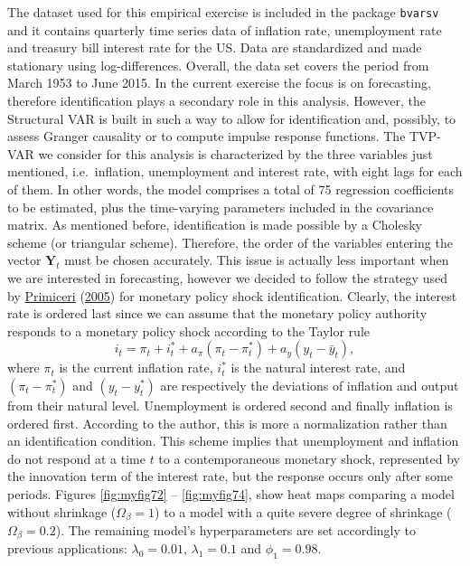 \documentclass[
  12pt,
]{book}
\theoremstyle{break}
\theoremstyle{nonumberplain}
\begin{document}
The dataset used for this empirical exercise is included in the package
\texttt{bvarsv} and it contains quarterly time series data of inflation
rate, unemployment rate and treasury bill interest rate for the US. Data
are standardized and made stationary using log-differences. Overall, the
data set covers the period from March 1953 to June 2015. In the current
exercise the focus is on forecasting, therefore identification plays a
secondary role in this analysis. However, the Structural VAR is built in
such a way to allow for identification and, possibly, to assess Granger
causality or to compute impulse response functions. The TVP-VAR we
consider for this analysis is characterized by the three variables just
mentioned, i.e.~inflation, unemployment and interest rate, with eight
lags for each of them. In other words, the model comprises a total of 75
regression coefficients to be estimated, plus the time-varying
parameters included in the covariance matrix. As mentioned before,
identification is made possible by a Cholesky scheme (or triangular
scheme). Therefore, the order of the variables entering the vector
\(\boldsymbol{Y}_{t}\) must be chosen accurately. This issue is actually
less important when we are interested in forecasting, however we decided
to follow the strategy used by
\protect\hyperlink{ref-Primicieri_2005}{Primiceri}
(\protect\hyperlink{ref-Primicieri_2005}{2005}) for monetary policy
shock identification. Clearly, the interest rate is ordered last since
we can assume that the monetary policy authority responds to a monetary
policy shock according to the Taylor rule
\[i_{t}=\pi _{t}+i_{t}^{*}+a_{\pi }(\pi _{t}-\pi _{t}^{*})+a_{y}(y_{t}-{\bar  y}_{t}),
\] where \(\pi _{t}\) is the current inflation rate, \(i_{t}^{*}\) is
the natural interest rate, and \((\pi _{t}-\pi _{t}^{*})\) and
\((y_{t}-{ y}_{t}^{*})\) are respectively the deviations of inflation
and output from their natural level. Unemployment is ordered second and
finally inflation is ordered first. According to the author, this is
more a normalization rather than an identification condition. This
scheme implies that unemployment and inflation do not respond at a time
\(t\) to a contemporaneous monetary shock, represented by the innovation
term of the interest rate, but the response occurs only after some
periods. Figures \ref{fig:myfig72} -- \ref{fig:myfig74}, show heat maps
comparing a model without shrinkage (\(\Omega_{\beta}=1\)) to a model
with a quite severe degree of shrinkage (\(\Omega_{\beta}=0.2\)). The
remaining model's hyperparameters are set accordingly to previous
applications: \(\lambda_0=0.01\), \(\lambda_1=0.1\) and \(\phi_1=0.98\).
\end{document}
